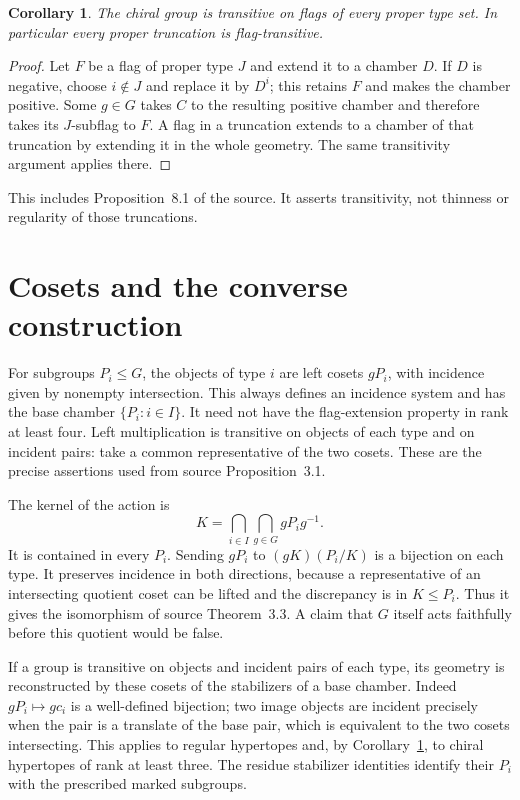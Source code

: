 \documentclass[11pt,a4paper]{article}
\newtheorem{corollary}[theorem]{Corollary}
\begin{document}
\begin{corollary}\label{cor:properflags}
The chiral group is transitive on flags of every proper type set.
In particular every proper truncation is flag-transitive.
\end{corollary}
\begin{proof}
Let $F$ be a flag of proper type $J$ and extend it to a chamber $D$.
If $D$ is negative, choose $i\notin J$ and replace it by $D^i$; this
retains $F$ and makes the chamber positive.  Some $g\in G$ takes $C$
to the resulting positive chamber and therefore takes its $J$-subflag
to $F$.  A flag in a truncation extends to a chamber of that truncation
by extending it in the whole geometry.  The same transitivity argument
applies there.
\end{proof}
This includes Proposition~8.1 of the source.  It asserts transitivity,
not thinness or regularity of those truncations.

\section{Cosets and the converse construction}

For subgroups $P_i\le G$, the objects of type $i$ are left cosets
$gP_i$, with incidence given by nonempty intersection.  This always
defines an incidence system and has the base chamber $\{P_i:i\in I\}$.
It need not have the flag-extension property in rank at least four.
Left multiplication is transitive on objects of each type and on
incident pairs: take a common representative of the two cosets.
These are the precise assertions used from source Proposition~3.1.

The kernel of the action is
\[
              K=\bigcap_{i\in I}\bigcap_{g\in G}gP_ig^{-1}.
\]
It is contained in every $P_i$.  Sending $gP_i$ to
$(gK)(P_i/K)$ is a bijection on each type.  It preserves incidence in
both directions, because a representative of an intersecting quotient
coset can be lifted and the discrepancy is in $K\le P_i$.
Thus it gives the isomorphism of source Theorem~3.3.  A claim that $G$
itself acts faithfully before this quotient would be false.

If a group is transitive on objects and incident pairs of each type,
its geometry is reconstructed by these cosets of the stabilizers of a
base chamber.  Indeed $gP_i\mapsto gc_i$ is a well-defined bijection;
two image objects are incident precisely when the pair is a translate
of the base pair, which is equivalent to the two cosets intersecting.
This applies to regular hypertopes and, by Corollary~\ref{cor:properflags},
to chiral hypertopes of rank at least three.  The residue stabilizer
identities identify their $P_i$ with the prescribed marked subgroups.
\end{document}
